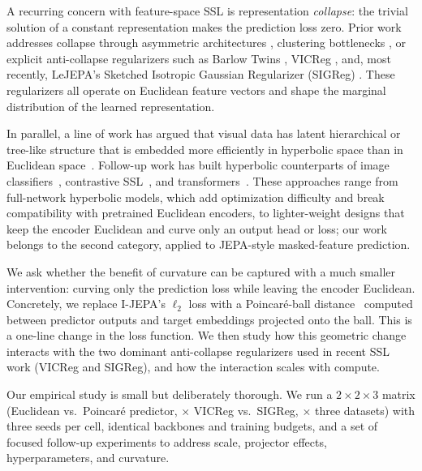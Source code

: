 \documentclass{article}
\begin{document}
A recurring concern with feature-space SSL is representation \emph{collapse}: the trivial solution of a constant representation makes the prediction loss zero. Prior work addresses collapse through asymmetric architectures \citep{grill2020byol,chen2021simsiam}, clustering bottlenecks \citep{caron2020swav}, or explicit anti-collapse regularizers such as Barlow Twins \citep{zbontar2021barlowtwins}, VICReg \citep{bardes2022vicreg}, and, most recently, LeJEPA's Sketched Isotropic Gaussian Regularizer (SIGReg) \citep{ball2025lejepa}. These regularizers all operate on Euclidean feature vectors and shape the marginal distribution of the learned representation.

In parallel, a line of work has argued that visual data has latent hierarchical or tree-like structure that is embedded more efficiently in hyperbolic space than in Euclidean space~\citep{nickel2017poincare,khrulkov2020hyperbolic,ganea2018hyperbolic}. Follow-up work has built hyperbolic counterparts of image classifiers~\citep{vanspengler2023poincareresnet}, contrastive SSL~\citep{yue2023hyperbolic}, and transformers~\citep{chen2022hyperbolic}. These approaches range from full-network hyperbolic models, which add optimization difficulty and break compatibility with pretrained Euclidean encoders, to lighter-weight designs that keep the encoder Euclidean and curve only an output head or loss; our work belongs to the second category, applied to JEPA-style masked-feature prediction.

We ask whether the benefit of curvature can be captured with a much smaller intervention: curving only the prediction loss while leaving the encoder Euclidean. Concretely, we replace I-JEPA's $\ell_2$ loss with a Poincar\'{e}-ball distance~\citep{ganea2018hyperbolic} computed between predictor outputs and target embeddings projected onto the ball. This is a one-line change in the loss function. We then study how this geometric change interacts with the two dominant anti-collapse regularizers used in recent SSL work (VICReg and SIGReg), and how the interaction scales with compute.

Our empirical study is small but deliberately thorough. We run a $2{\times}2{\times}3$ matrix (Euclidean vs.\ Poincar\'{e} predictor, $\times$ VICReg vs.\ SIGReg, $\times$ three datasets) with three seeds per cell, identical backbones and training budgets, and a set of focused follow-up experiments to address scale, projector effects, hyperparameters, and curvature.
\end{document}
